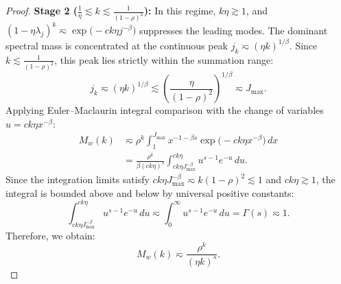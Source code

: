 \documentclass[11pt]{article}
\begin{document}
\begin{proof}
\medskip
\noindent\textbf{Stage 2 ($\frac{1}{\eta} \lesssim k \lesssim \frac{1}{(1-\rho)^2}$):}
In this regime, $k\eta \gtrsim 1$, and $(1-\eta\lambda_j)^k \eqsim \exp\bigl(-c k \eta j^{-\beta}\bigr)$ suppresses the leading modes. The dominant spectral mass is concentrated at the continuous peak $j_k \eqsim (\eta k)^{1/\beta}$. Since $k \lesssim \frac{1}{(1-\rho)^2}$, this peak lies strictly within the summation range:
\[
    j_k \eqsim (\eta k)^{1/\beta} \lesssim \left(\frac{\eta}{(1-\rho)^2}\right)^{1/\beta} \eqsim J_{\max}.
\]
Applying Euler--Maclaurin integral comparison with the change of variables $u = c k \eta x^{-\beta}$:
\begin{align*}
    M_w(k) 
    &\eqsim \rho^k \int_1^{J_{\max}} x^{-1-\beta s} \exp\bigl(-c k \eta x^{-\beta}\bigr) \, dx \\
    &= \frac{\rho^k}{\beta (c k \eta)^s} \int_{c k \eta J_{\max}^{-\beta}}^{c k \eta} u^{s-1} e^{-u} \, du.
\end{align*}
Since the integration limits satisfy $c k \eta J_{\max}^{-\beta} \eqsim k(1-\rho)^2 \lesssim 1$ and $c k \eta \gtrsim 1$, the integral is bounded above and below by universal positive constants:
\[
    \int_{c k \eta J_{\max}^{-\beta}}^{c k \eta} u^{s-1} e^{-u} \, du \eqsim \int_0^{\infty} u^{s-1} e^{-u} \, du = \Gamma(s) \eqsim 1.
\]
Therefore, we obtain:
\[
    M_w(k) \eqsim \frac{\rho^k}{(\eta k)^s}.
\]


\end{proof}
\end{document}
